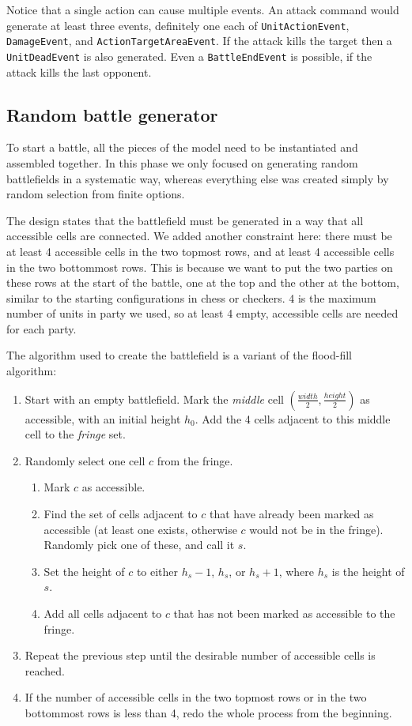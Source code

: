 Notice that a single action can cause multiple events. An attack command would generate at least three events, definitely one each of \texttt{UnitActionEvent}, \texttt{DamageEvent}, and \texttt{ActionTargetAreaEvent}. If the attack kills the target then a \texttt{UnitDeadEvent} is also generated. Even a  \texttt{BattleEndEvent} is possible, if the attack kills the last opponent.

\subsection{Random battle generator}

To start a battle, all the pieces of the model need to be instantiated and assembled together. In this phase we only focused on generating random battlefields in a systematic way, whereas everything else was created simply by random selection from finite options.

The design states that the battlefield must be generated in a way that all accessible cells are connected. We added another constraint here: there must be at least 4 accessible cells in the two topmost rows, and at least 4 accessible cells in the two bottommost rows. This is because we want to put the two parties on these rows at the start of the battle, one at the top and the other at the bottom, similar to the starting configurations in chess or checkers. 4 is the maximum number of units in party we used, so at least 4 empty, accessible cells are needed for each party.

The algorithm used to create the battlefield is a variant of the flood-fill algorithm:
\begin{enumerate}
	\item Start with an empty battlefield. Mark the \textit{middle} cell $(\frac{width}{2}, \frac{height}{2})$ as accessible, with an initial height $h_0$. Add the 4 cells adjacent to this middle cell to the \textit{fringe} set.
	\item Randomly select one cell $c$ from the fringe.
	\begin{enumerate}
		\item Mark $c$ as accessible.
		\item Find the set of cells adjacent to $c$ that have already been marked as accessible (at least one exists, otherwise $c$ would not be in the fringe). Randomly pick one of these, and call it $s$.
		\item Set the height of $c$ to either $h_s-1$, $h_s$, or $h_s+1$, where $h_s$ is the height of $s$.
		\item Add all cells adjacent to $c$ that has not been marked as accessible to the fringe.
	\end{enumerate}
	\item Repeat the previous step until the desirable number of accessible cells is reached.
	\item If the number of accessible cells in the two topmost rows or in the two bottommost rows is less than 4, redo the whole process from the beginning.
\end{enumerate}


